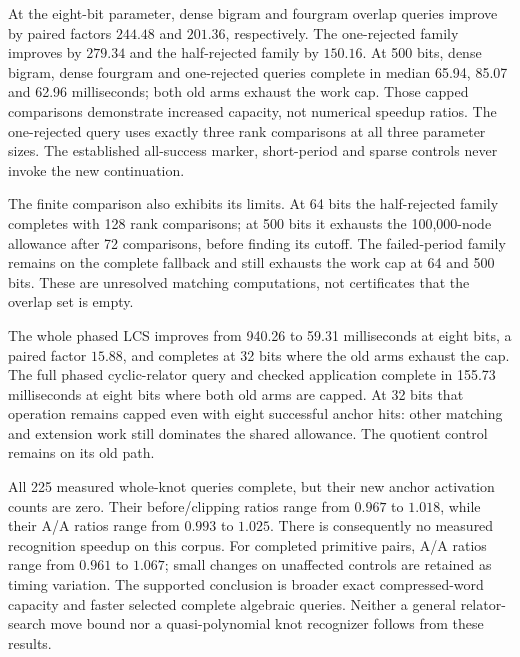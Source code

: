 At the eight-bit parameter, dense bigram and fourgram overlap queries improve
by paired factors $244.48$ and $201.36$, respectively. The one-rejected family
improves by $279.34$ and the half-rejected family by $150.16$. At 500 bits,
dense bigram, dense fourgram and one-rejected queries complete in median
65.94, 85.07 and 62.96 milliseconds; both old arms exhaust the work cap.
Those capped comparisons demonstrate increased capacity, not numerical
speedup ratios. The one-rejected query uses exactly three rank comparisons
at all three parameter sizes. The established all-success marker, short-period
and sparse controls never invoke the new continuation.

The finite comparison also exhibits its limits. At 64 bits the half-rejected
family completes with 128 rank comparisons; at 500 bits it exhausts the
100,000-node allowance after 72 comparisons, before finding its cutoff.
The failed-period family remains on the complete fallback and still exhausts
the work cap at 64 and 500 bits. These are unresolved matching computations,
not certificates that the overlap set is empty.

The whole phased LCS improves from 940.26 to 59.31 milliseconds at eight bits,
a paired factor $15.88$, and completes at 32 bits where the old arms exhaust
the cap. The full phased cyclic-relator query and checked application complete
in 155.73 milliseconds at eight bits where both old arms are capped. At 32
bits that operation remains capped even with eight successful anchor hits:
other matching and extension work still dominates the shared allowance.
The quotient control remains on its old path.

All 225 measured whole-knot queries complete, but their new anchor activation
counts are zero. Their before/clipping ratios range from $0.967$ to $1.018$,
while their A/A ratios range from $0.993$ to $1.025$. There is consequently no
measured recognition speedup on this corpus. For completed primitive pairs,
A/A ratios range from $0.961$ to $1.067$; small changes on unaffected controls
are retained as timing variation. The supported conclusion is broader exact
compressed-word capacity and faster selected complete algebraic queries.
Neither a general relator-search move bound nor a quasi-polynomial knot
recognizer follows from these results.
